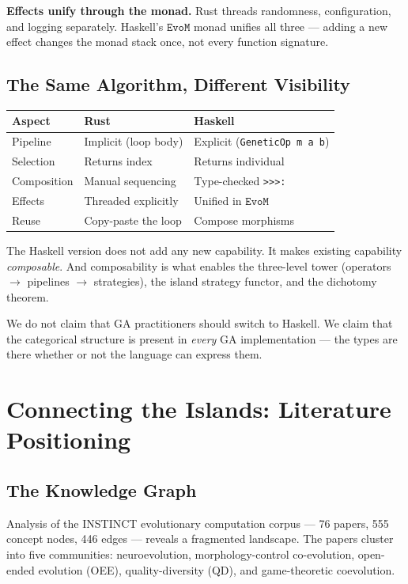 \documentclass[10pt]{article}
\newcommand{\EvoM}{\texttt{EvoM}}
\begin{document}
\textbf{Effects unify through the monad.} Rust threads randomness, configuration, and logging separately. Haskell's $\EvoM$ monad unifies all three --- adding a new effect changes the monad stack once, not every function signature.

\subsection{The Same Algorithm, Different Visibility}

\begin{table}[ht]
\centering
\begin{tabular}{@{}lll@{}}
\toprule
\textbf{Aspect} & \textbf{Rust} & \textbf{Haskell} \\
\midrule
Pipeline    & Implicit (loop body)      & Explicit (\texttt{GeneticOp m a b}) \\
Selection   & Returns index             & Returns individual \\
Composition & Manual sequencing         & Type-checked \texttt{>{>}{>}:} \\
Effects     & Threaded explicitly       & Unified in $\EvoM$ \\
Reuse       & Copy-paste the loop       & Compose morphisms \\
\bottomrule
\end{tabular}
\end{table}

The Haskell version does not add any new capability. It makes existing capability \emph{composable}. And composability is what enables the three-level tower (operators $\to$ pipelines $\to$ strategies), the island strategy functor, and the dichotomy theorem.

We do not claim that GA practitioners should switch to Haskell. We claim that the categorical structure is present in \emph{every} GA implementation --- the types are there whether or not the language can express them.

\section{Connecting the Islands: Literature Positioning}

\subsection{The Knowledge Graph}

Analysis of the INSTINCT evolutionary computation corpus --- 76 papers, 555 concept nodes, 446 edges --- reveals a fragmented landscape. The papers cluster into five communities: neuroevolution, morphology-control co-evolution, open-ended evolution (OEE), quality-diversity (QD), and game-theoretic coevolution.
\end{document}
